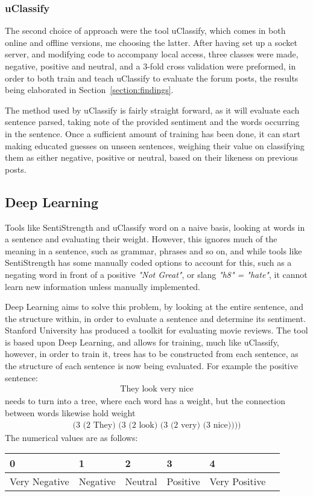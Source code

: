 \documentclass{sig-alternate}
\begin{document}
\subsubsection{uClassify}
\label{sec:uClassify}
The second choice of approach were the tool uClassify\cite{uClassify}, which comes in both online and offline versions, me choosing the latter. After having set up a socket server, and modifying code to accompany local access, three classes were made, negative, positive and neutral, and a 3-fold cross validation were preformed, in order to both train  and teach uClassify to evaluate the forum posts, the results being elaborated in Section~\ref{section:findings}.

The method used by uClassify is fairly straight forward, as it will evaluate each sentence parsed, taking note of the provided sentiment and the words occurring in the sentence. Once a sufficient amount of training has been done, it can start making educated guesses on unseen sentences, weighing their value on classifying them as either negative, positive or neutral, based on their likeness on previous posts.

\subsection{Deep Learning}
Tools like SentiStrength and uClassify word on a naive basis, looking at words in a sentence and evaluating their weight. However, this ignores much of the meaning in a sentence, such as grammar, phrases and so on, and while tools like SentiStrength has some manually coded options to account for this, such as a negating word in front of a positive \textit{"Not Great"}, or slang \textit{"h8" = "hate"}, it cannot learn new information unless manually implemented.

Deep Learning aims to solve this problem, by looking at the entire sentence, and the structure within, in order to evaluate a sentence and determine its sentiment. Stanford University has produced a toolkit\cite{STANFORD} for evaluating movie reviews. The tool is based upon Deep Learning, and allows for training, much like uClassify, however, in order to train it, trees has to be constructed from each sentence, as the structure of each sentence is now being evaluated.
For example the positive sentence:
\begin{gather*}
\mbox{They look very nice}
\end{gather*}
needs to turn into a tree, where each word has a weight, but the connection between words likewise hold weight
\begin{gather*}
\mbox{(3 (2 They) (3 (2 look) (3 (2 very) (3 nice))))}
\end{gather*}
The numerical values are as follows:
\begin{table}[h!]
\begin{tabular}{l l l l ll}
0 & 1 & 2 & 3 & 4\\
\hline
Very Negative & Negative & Neutral & Positive & Very Positive
\end{tabular}
\end{table}
\end{document}
